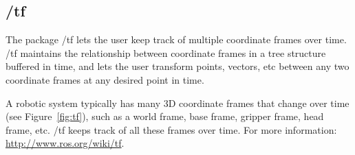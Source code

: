 \subsection{/tf}
\label{sec:tf}

The package /tf lets the user keep track of multiple coordinate frames over time. /tf maintains the relationship between coordinate frames in a tree structure buffered in time, and lets the user transform points, vectors, etc between any two coordinate frames at any desired point in time.

A robotic system typically has many 3D coordinate frames that change over time (see Figure~\ref{fig:tf}), such as a world frame, base frame, gripper frame, head frame, etc. /tf keeps track of all these frames over time.
For more information: \url{http://www.ros.org/wiki/tf}.

